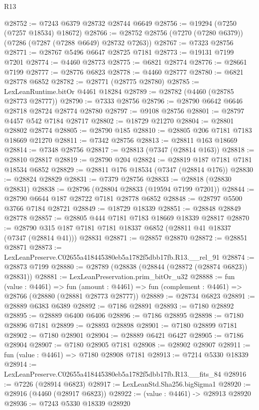 \begin{lexlean}{R13}
\begin{coremodule}
@28752 := @7243 @6379 @28732 @28744 @6649
@28756 := @19294 (@7250 (@7257 @18534) @18672)
@28766 := @28752 @28756 (@7270 (@7280 @6379)) (@7286 (@7287 (@7288 @6649) @28732 @7263))
@28767 := @7323 @28756
@28771 := @28767 @5496 @6647 @28725 @7181
@28773 := @19131 @7199 @7201
@28774 := @4460 @28773
@28775 := @6821 @28774
@28776 := @28661 @7199
@28777 := @28776 @6823
@28778 := @4460 @28777
@28780 := @6821 @28778 @6852
@28782 := @28771 (@28775 @28780)
@28785 := LexLeanRuntime.bitOr @4461 @18284
@28789 := @28782 (@4460 (@28785 @28773 @28777))
@28790 := @7333 @28756
@28796 := @28790 @6642 @6646 @28718 @28724 @28774 @28780
@28797 := @9108 @28756
@28801 := @28797 @4457 @542 @7184 @28717
@28802 := @18729 @21270
@28804 := @28801 @28802 @28774
@28805 := @28790 @185
@28810 := @28805 @206 @7181 @7183 @18669 @21270
@28811 := @7342 @28756
@28813 := @28811 @163 @18669
@28814 := @7348 @28756
@28817 := @28813 (@7347 (@28814 @163))
@28818 := @28810 @28817
@28819 := @28790 @204
@28824 := @28819 @187 @7181 @7181 @18534 @6852
@28829 := @28811 @176 @18534 (@7347 (@28814 @176))
@28830 := @28824 @28829
@28831 := @7379 @28756
@28833 := @28818 (@28830 @28831)
@28838 := @28796 (@28804 @28833 (@19594 @7199 @7201))
@28844 := @28790 @6644 @187 @28722 @7181 @28778 @6852
@28848 := @28797 @5500 @3766 @7184 @28721
@28849 := @18729 @18339
@28851 := @28848 @28849 @28778
@28857 := @28805 @444 @7181 @7183 @18669 @18339 @28817
@28870 := @28790 @315 @187 @7181 @7181 @18337 @6852 (@28811 @41 @18337 (@7347 (@28814 @41))) @28831
@28871 := @28857 @28870
@28872 := @28851 @28871
@28873 := LexLeanPreserve.C02655a418445380eb5a1782f5dbb17fb.R13.__rel_91
@28874 := @28873 @7199
@28880 := @28789 (@28838 (@28844 (@28872 (@28874 @6823)) @28831))
@28881 := LexLeanPreservation.prim_bitOr_u32
@28888 := fun (value : @4461) =>
  fun (amount : @4461) => fun (complement : @4461) => @28766 (@28880 (@28881 @28773 @28777))
@28889 := @28734 @6823
@28891 := @28889 @6383 @6389
@28892 := @7186 @28891
@28893 := @7180 @28892
@28895 := @28889 @6400 @6406
@28896 := @7186 @28895
@28898 := @7180 @28896 @7181
@28899 := @28893 @28898
@28901 := @7180 @28899 @7181
@28902 := @7180 @28901
@28904 := @28889 @6421 @6427
@28905 := @7186 @28904
@28907 := @7180 @28905 @7181
@28908 := @28902 @28907
@28911 := fun (value : @4461) => @7180 @28908 @7181
@28913 := @7214 @5330 @18339
@28914 := LexLeanPreserve.C02655a418445380eb5a1782f5dbb17fb.R13.__fits_84
@28916 := @7226 (@28914 @6823)
@28917 := LexLeanStd.Sha256.bigSigma1
@28920 := @28916 (@4460 (@28917 @6823))
@28922 := (value : @4461) -> @28913 @28920
@28936 := @7243
    @5330
    @18339
    @28920

\end{coremodule}
\end{lexlean}
